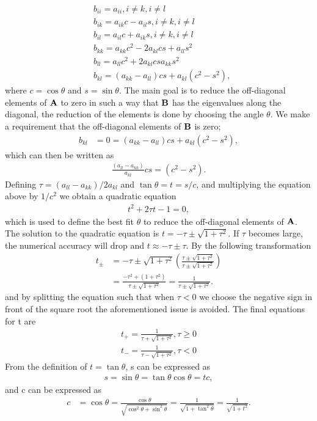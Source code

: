 \documentclass{emulateapj}
\begin{document}
%
\begin{align*}
    &b_{ii} = a_{ii}, i \neq k, i \neq l \\
    &b_{ik} = a_{ik}c - a_{il}s, i\neq k, i\neq l \\
    &b_{il} = a_{il}c + a_{ik}s, i \neq k, i\neq l \\
    &b_{kk} = a_{kk} c^2 - 2a_{kl}cs+ a_{ll}s^2 \\
    &b_{ll} = a_{ll} c^2 + 2a_{kl}cs a_{kk}s^2 \\
    &b_{kl} = \left(a_{kk} - a_{ll}\right)cs + a_{kl}\left(c^2 - s^2\right),
\end{align*}
where $c = \cos\theta$ and $s = \sin\theta$. The main goal is to reduce the off-diagonal elements of $\bold{A}$ to zero in such a way that $\bold{B}$ has the eigenvalues along the diagonal, the reduction of the elements is done by choosing the angle $\theta$. We make a requirement that the off-diagonal elements of $\bold{B}$ is zero;
%
\begin{align*}
    b_{kl} &= 0 = \left(a_{kk} - a_{ll}\right)cs + a_{kl} \left(c^2 - s^2\right),
\end{align*}
%
which can then be written as
%
\begin{gather*}
    \frac{\left(a_{ll} - a_{kk}\right)}{a_{kl}}cs = \left(c^2 - s^2\right).
\end{gather*}
%
Defining $\tau = \left(a_{ll} - a_{kk}\right)/2a_{kl}$ and $\tan\theta = t = s/c$, and multiplying the equation above by $1/c^2$ we obtain a quadratic equation 
%
\begin{gather*}
    t^2 + 2\tau t - 1 = 0,
\end{gather*}
%
which is used to define the best fit $\theta$ to reduce the off-diagonal elements of $\bold{A}$. The solution to the quadratic equation is $t = -\tau \pm \sqrt{1 + \tau^2}$. If $\tau$ becomes large, the numerical accuracy will drop and $t \approx -\tau \pm \tau$. By the following transformation
%
\begin{align*}
    t_{\pm} &= -\tau \pm \sqrt{1+\tau^2}\left(\frac{\tau \pm \sqrt{1+\tau^2}}{\tau \pm \sqrt{1+\tau^2}}\right) \\
    &= \frac{-\tau^2 + \left(1 + \tau^2\right)}{\tau \pm \sqrt{1 + \tau^2}} = \frac{1}{\tau \pm \sqrt{1+\tau^2}}.
\end{align*}
%
and by splitting the equation such that when $\tau < 0$ we choose the negative sign in front of the square root the aforementioned issue is avoided. The final equations for t are
%
\begin{align*}
    t_+ = \frac{1}{\tau + \sqrt{1 + \tau^2}}, \tau \geq 0 \\
    t_- = \frac{1}{\tau - \sqrt{1 + \tau^2}}, \tau < 0
\end{align*}
%
From the definition of $t = \tan\theta$, s can be expressed as
%
\begin{align*}
    s = \sin\theta = \tan\theta \cos\theta = tc,
\end{align*}
and c can be expressed as
\begin{align*}
    c &= \cos\theta = \frac{\cos\theta}{\sqrt{\cos^2\theta + \sin^2\theta}} = \frac{1}{\sqrt{1 + \tan^2\theta}}  = \frac{1}{\sqrt{1 + t^2}}.
\end{align*}
\end{document}
